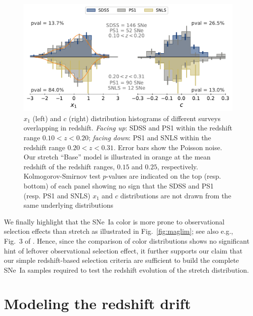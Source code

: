 \documentclass[]{aa}
\begin{document}
\begin{figure}
    \centering
    \includegraphics[width=0.95\linewidth]{Article_figures/both-cut_SDSS_SNLS_PS1.pdf}
    \caption{$x_1$ (left) and $c$ (right) distribution histograms of
            different surveys overlapping in redshift. \textit{Facing up}: SDSS
            and PS1 within the redshift range $0.10 < z < 0.20$; \textit{facing
            down}: PS1 and SNLS within the redshift range $0.20 < z < 0.31$.
            Error bars show the Poisson noise. Our stretch ``Base'' model is
            illustrated in orange at the mean redshift of the redshift ranges,
            $0.15$ and $0.25$, respectively. Kolmogorov-Smirnov test $p$-values
            are indicated on the top (resp. bottom) of each panel showing no
            sign that the SDSS and PS1 (resp. PS1 and SNLS) $x_1$ and $c$
            distributions are not drawn from the same underlying
    distributions}
    \label{fig:distrib}
\end{figure}

We finally highlight that the SNe~Ia color is more prone to
    observational selection effects than stretch as illustrated in
    Fig.~\ref{fig:maglim}; see also e.g., Fig.~3 of \cite{kessler2017}. Hence,
    since the comparison of color distributions shows no significant hint of
    leftover observational selection effect, it further supports our claim that
    our simple redshift-based selection criteria are sufficient to build the
    complete SNe~Ia samples required to test the redshift evolution of the
stretch distribution.

\section{Modeling the redshift drift}\label{sec:modeling}
\end{document}
